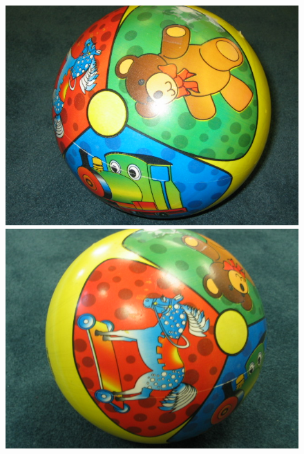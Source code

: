 \documentclass[twocolumn]{article}
\begin{document}
\begin{figure}
{				\includegraphics[scale=0.091]{ukbench09985.jpg}
				\includegraphics[scale=0.091]{ukbench09987.jpg}
			}


\end{figure}
\end{document}
